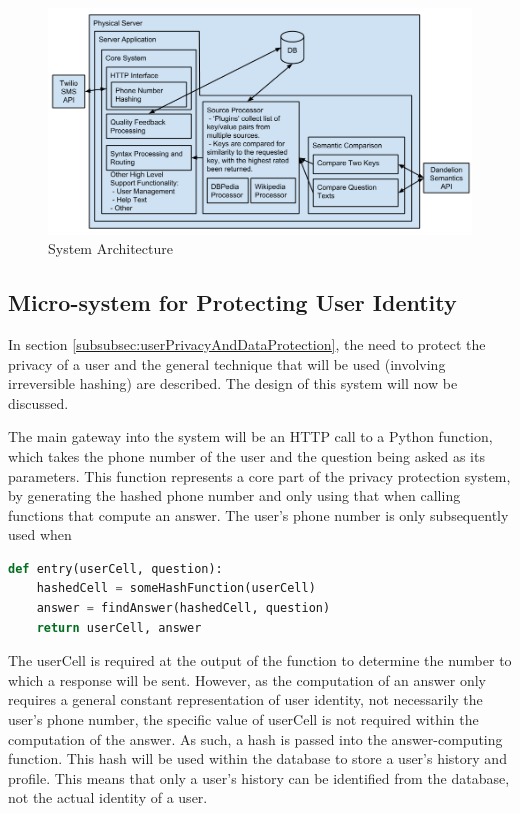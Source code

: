 \documentclass[authoryearcitations]{UoYCSproject}
\begin{document}
\begin{figure}[htb] 
\includegraphics[width=\linewidth]{systemArchitecture}
\caption{System Architecture}
\label{fig:systemArchitecture}
\end{figure}

\subsection{Micro-system for Protecting User Identity}

In section \ref{subsubsec:userPrivacyAndDataProtection}, the need to protect the privacy of a user and the general technique that will be used (involving irreversible hashing) are described.  The design of this system will now be discussed.

The main gateway into the system will be an HTTP call to a Python function, which takes the phone number of the user and the question being asked as its parameters.  This function represents a core part of the privacy protection system, by generating the hashed phone number and only using that when calling functions that compute an answer.  The user's phone number is only subsequently used when 


\begin{lstlisting}[language=Python]
def entry(userCell, question):
    hashedCell = someHashFunction(userCell)
    answer = findAnswer(hashedCell, question)
    return userCell, answer
\end{lstlisting}

The userCell is required at the output of the function to determine the number to which a response will be sent.  However, as the computation of an answer only requires a general constant representation of user identity, not necessarily the user's phone number, the specific value of userCell is not required within the computation of the answer.  As such, a hash is passed into the answer-computing function.  This hash will be used within the database to store a user's history and profile.  This means that only a user's history can be identified from the database, not the actual identity of a user.
\end{document}
